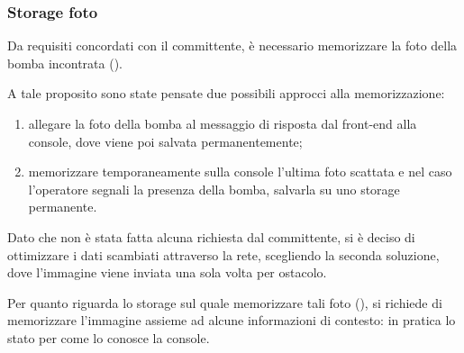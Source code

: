%
%

\subsubsection{Storage foto}

Da requisiti concordati con il committente, è necessario memorizzare la foto della bomba incontrata ().

A tale proposito sono state pensate due possibili approcci alla memorizzazione:

\begin{enumerate}
  \item allegare la foto della bomba al messaggio di risposta dal front-end alla console, dove viene poi salvata permanentemente;
  \item memorizzare temporaneamente sulla console l'ultima foto scattata e nel caso l'operatore segnali la presenza della bomba, salvarla su uno storage permanente.
\end{enumerate}

Dato che non è stata fatta alcuna richiesta dal committente, si è deciso di ottimizzare i dati scambiati attraverso la rete, scegliendo la seconda soluzione, dove l'immagine viene inviata una sola volta per ostacolo.

Per quanto riguarda lo storage sul quale memorizzare tali foto (), si richiede di memorizzare l'immagine assieme ad alcune informazioni di contesto:
in pratica lo stato per come lo conosce la console.

